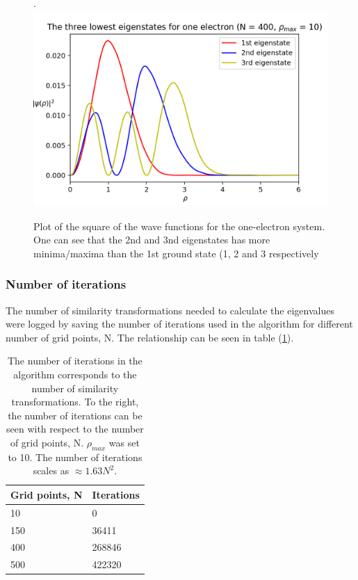 \documentclass[10pt,a4paper,titlepage]{article}
\begin{document}
\begin{figure}[!h]
\centering
\caption{Plot of the square of the wave functions for the one-electron system. One can see that the 2nd and 3nd eigenstates has more minima/maxima than the 1st ground state (1, 2 and 3 respectively}.
\label{fig:wave_one}
\includegraphics[scale=0.6]{three_lowest_one_e.png}
\end{figure}

\subsubsection{Number of iterations}
The number of similarity transformations needed to calculate the eigenvalues were logged by saving the number of iterations used in the algorithm for different number of grid points, N. The relationship can be seen in table (\ref{tab:iteratiation}).
\begin{table}[!h]
\centering
\caption{The number of iterations in the algorithm corresponds to the number of similarity transformations. To the right, the number of iterations can be seen with respect to the number of grid points, N. $\rho_{max}$ was set to 10. The number of iterations scales as $\approx 1.63N^{2}$.}
\label{tab:iteratiation}
\begin{tabular}{|l|l|}
\hline
\bf Grid points, N    &\bf Iterations\\ \hline
10       &  0  \\ \hline
150      &  36411   \\ \hline
400      &  268846  \\ \hline
500      &  422320  \\ \hline

\end{tabular}
\end{table}
\end{document}
